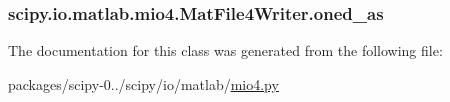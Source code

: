 \subsubsection[{oned\+\_\+as}]{\setlength{\rightskip}{0pt plus 5cm}scipy.\+io.\+matlab.\+mio4.\+Mat\+File4\+Writer.\+oned\+\_\+as}\label{classscipy_1_1io_1_1matlab_1_1mio4_1_1MatFile4Writer_a106059d84228c76e91366d4580f1a44c}


The documentation for this class was generated from the following file\+:\begin{DoxyCompactItemize}
\item 
packages/scipy-\/0../scipy/io/matlab/\hyperlink{mio4_8py}{mio4.\+py}\end{DoxyCompactItemize}
